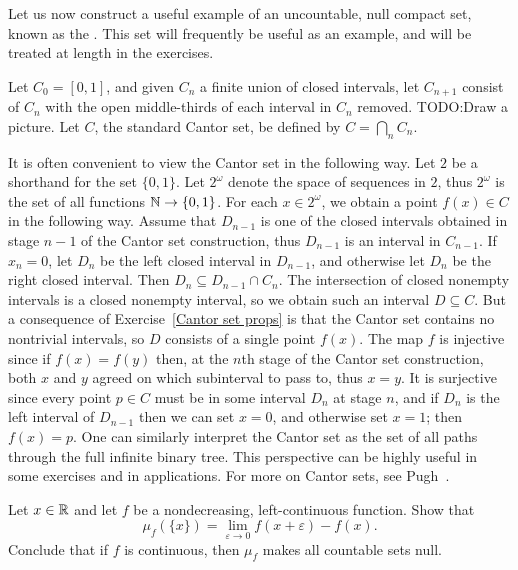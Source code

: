 \begin{subsec}
Let us now construct a useful example of an uncountable, null compact set, known as the .
This set will frequently be useful as an example, and will be treated at length in the exercises.

Let $C_{0} = [0, 1]$, and given $C_{n}$ a finite union of closed intervals, let $C_{n+1}$ consist of $C_{n}$ with the open middle-thirds of each interval in $C_{n}$ removed. TODO:\@ Draw a picture.
Let $C$, the standard Cantor set, be defined by $C = \bigcap_{n} C_{n}$.
\end{subsec}

\begin{subsec}
It is often convenient to view the Cantor set in the following way. Let $2$ be a shorthand for the set $\{0, 1\}$.
Let $2^{\omega}$ denote the space of sequences in $2$, thus $2^{\omega}$ is the set of all functions $\mathbb{N} \to \{0, 1\}$.
For each $x \in 2^{\omega}$, we obtain a point $f(x) \in C$ in the following way.
Assume that $D_{n-1}$ is one of the closed intervals obtained in stage $n-1$ of the Cantor set construction, thus $D_{n-1}$ is an interval in $C_{n-1}$.
If $x_{n} = 0$, let $D_{n}$ be the left closed interval in $D_{n-1}$, and otherwise let $D_{n}$ be the right closed interval.
Then $D_{n} \subseteq D_{n-1} \cap C_{n}$.
The intersection of closed nonempty intervals is a closed nonempty interval, so we obtain such an interval $D \subseteq C$.
But a consequence of Exercise~\ref{Cantor set props} is that the Cantor set contains no nontrivial intervals, so $D$ consists of a single point $f(x)$.
The map $f$ is injective since if $f(x) = f(y)$ then, at the $n$th stage of the Cantor set construction, both $x$ and $y$ agreed on which subinterval to pass to, thus $x = y$.
It is surjective since every point $p \in C$ must be in some interval $D_{n}$ at stage $n$, and if $D_{n}$ is the left interval of $D_{n-1}$ then we can set $x = 0$, and otherwise set $x = 1$; then $f(x) = p$.
One can similarly interpret the Cantor set as the set of all paths through the full infinite binary tree.
This perspective can be highly useful in some exercises and in applications.
For more on Cantor sets, see Pugh~\cite[Chapter 2]{pugh2013real}.
\end{subsec}

\begin{exercise}
Let $x \in \mathbb{R}$ and let $f$ be a nondecreasing, left-continuous function. Show that
\[\mu_{f}(\{x\}) = \lim_{\varepsilon \to 0} f(x+\varepsilon) - f(x).\]
Conclude that if $f$ is continuous, then $\mu_{f}$ makes all countable sets null.
\end{exercise}

